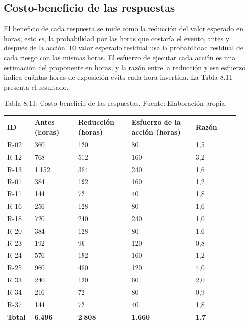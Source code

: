 \documentclass[11pt]{article}
\begin{document}
\subsection{Costo-beneficio de las respuestas}

El beneficio de cada respuesta se mide como la reducción del valor esperado en horas, esto es, la probabilidad por las horas que costaría el evento, antes y después de la acción. El valor esperado residual usa la probabilidad residual de cada riesgo con las mismas horas. El esfuerzo de ejecutar cada acción es una estimación del proponente en horas, y la razón entre la reducción y ese esfuerzo indica cuántas horas de exposición evita cada hora invertida. La Tabla 8.11 presenta el resultado.

Tabla 8.11: Costo-beneficio de las respuestas. Fuente: Elaboración propia.\label{tab:8-11}

\begin{longtable}{p{0.099\linewidth}p{0.178\linewidth}p{0.218\linewidth}p{0.258\linewidth}p{0.178\linewidth}}
\toprule
\textbf{ID} & \textbf{Antes (horas)} & \textbf{Reducción (horas)} & \textbf{Esfuerzo de la acción (horas)} & \textbf{Razón} \\
\midrule
\endhead
\bottomrule
\endlastfoot
R-02 & 360 & 120 & 80 & 1,5 \\
R-12 & 768 & 512 & 160 & 3,2 \\
R-13 & 1.152 & 384 & 240 & 1,6 \\
R-01 & 384 & 192 & 160 & 1,2 \\
R-11 & 144 & 72 & 40 & 1,8 \\
R-16 & 256 & 128 & 80 & 1,6 \\
R-18 & 720 & 240 & 240 & 1,0 \\
R-20 & 384 & 128 & 80 & 1,6 \\
R-23 & 192 & 96 & 120 & 0,8 \\
R-24 & 576 & 192 & 160 & 1,2 \\
R-25 & 960 & 480 & 120 & 4,0 \\
R-33 & 240 & 120 & 60 & 2,0 \\
R-34 & 216 & 72 & 80 & 0,9 \\
R-37 & 144 & 72 & 40 & 1,8 \\
\textbf{Total} & \textbf{6.496} & \textbf{2.808} & \textbf{1.660} & \textbf{1,7} \\
\end{longtable}
\end{document}
